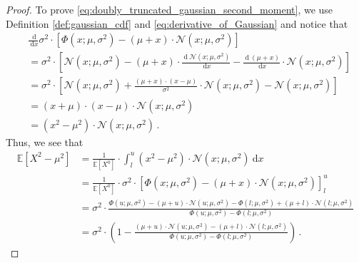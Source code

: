 \documentclass[a4paper]{article}
\newcommand{\Normal}[3]{{\mathcal N} \left({#1};{#2},{#3}\right)}
\newcommand{\NormalCDF}[3]{\Phi \left({#1};{#2},{#3}\right)}
\newcommand{\expect}[1]{{\mathbb E \left[ {#1} \right]}}
\newcommand{\intd}[1]{\ \mathrm{d}{#1}}
\theoremstyle{definition}
\begin{document}
\begin{proof}
    To prove \eqref{eq:doubly_truncated_gaussian_second_moment}, we use Definition \ref{def:gaussian_cdf} and \eqref{eq:derivative_of_Gaussian} and notice that 
    \begin{align*}
        & \frac{\intd{}}{\intd{x}} \sigma^2 \cdot \left[ \NormalCDF{x}{\mu}{\sigma^2} - \left( \mu + x \right) \cdot \Normal{x}{\mu}{\sigma^2} \right] \\        
        & =  \sigma^2 \cdot \left[ \Normal{x}{\mu}{\sigma^2} - \left( \mu + x \right) \cdot \frac{\intd{}\ \Normal{x}{\mu}{\sigma^2}}{\intd{x}} - \frac{\intd{}\ \left( \mu + x \right)}{\intd{x}} \cdot \Normal{x}{\mu}{\sigma^2} \right] \\
        & =  \sigma^2 \cdot \left[ \Normal{x}{\mu}{\sigma^2} + \frac{\left( \mu + x \right) \cdot \left( x-\mu \right)}{\sigma^2} \cdot \Normal{x}{\mu}{\sigma^2}  - \Normal{x}{\mu}{\sigma^2} \right] \\
        & = \left( x + \mu \right) \cdot \left( x - \mu \right) \cdot \Normal{x}{\mu}{\sigma^2} \\
        & = \left( x^2 - \mu^2 \right) \cdot \Normal{x}{\mu}{\sigma^2} \,.
    \end{align*}
    Thus, we see that 
    \begin{align*}
        \expect{X^2 - \mu^2} 
        & = \frac{1}{\expect{X^0}} \cdot \int_l^u \left( x^2 - \mu^2 \right) \cdot \Normal{x}{\mu}{\sigma^2} \intd{x} \\
        & = \frac{1}{\expect{X^0}} \cdot \sigma^2 \cdot \left[ \NormalCDF{x}{\mu}{\sigma^2} - \left( \mu + x \right) \cdot \Normal{x}{\mu}{\sigma^2} \right]_l^u \\
        & = \sigma^2 \cdot \frac{\NormalCDF{u}{\mu}{\sigma^2} - \left( \mu + u \right) \cdot \Normal{u}{\mu}{\sigma^2} - \NormalCDF{l}{\mu}{\sigma^2} + \left( \mu + l \right) \cdot \Normal{l}{\mu}{\sigma^2}}{\NormalCDF{u}{\mu}{\sigma^2} - \NormalCDF{l}{\mu}{\sigma^2}} \\
        & = \sigma^2 \cdot \left( 1 - \frac{\left( \mu + u \right) \cdot \Normal{u}{\mu}{\sigma^2}  - \left( \mu + l \right) \cdot \Normal{l}{\mu}{\sigma^2}}{\NormalCDF{u}{\mu}{\sigma^2} - \NormalCDF{l}{\mu}{\sigma^2}} \right) \,.
    \end{align*}
\end{proof}
\end{document}
